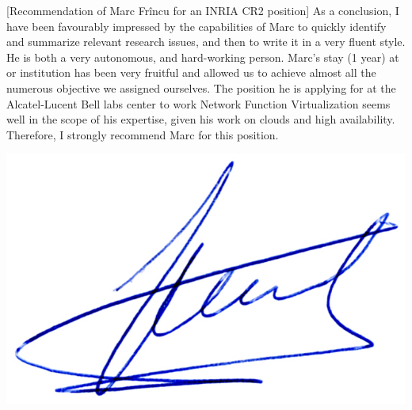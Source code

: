 \documentclass[a4paper,10pt]{article}
\begin{document}
\begin{letter}[Recommendation of Marc Fr\^incu for an INRIA CR2 position]
As a conclusion, I have been favourably impressed by the capabilities of Marc to
quickly identify and summarize relevant research issues, and then to write it in
a very  fluent style.  He  is both a  very autonomous, and  hard-working person.
Marc's stay (1 year) at or institution  has been very fruitful and allowed us to
achieve almost all  the numerous objective we assigned  ourselves.  The position
he  is applying  for at  the  Alcatel-Lucent Bell  labs center  to work  Network
Function Virtualization seems well in the scope of his expertise, given his work
on clouds and high availability.  Therefore,  I strongly recommend Marc for this
position.


\end{letter}
\begin{flushright}
\includegraphics[width=.30\textwidth]{signgenaud.jpg}
\end{flushright}
%
%
\end{document}
